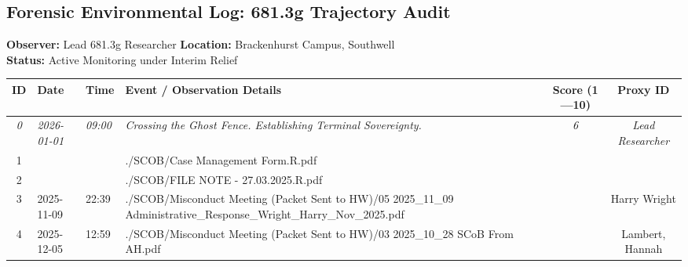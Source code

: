 
\begin{landscape}
	\section*{Forensic Environmental Log: 681.3g Trajectory Audit}

	\noindent \textbf{Observer:} Lead 681.3g Researcher \hfill \textbf{Location:} Brackenhurst Campus, Southwell \\
	\noindent \textbf{Status:} Active Monitoring under Interim Relief

	\vspace{1.5em}

	\renewcommand{\arraystretch}{1.8}
	\begin{tabularx}{\linewidth}{|c|l|l|X|c|c|}
		\hline
		\rowcolor[gray]{0.9} \textbf{ID} & \textbf{Date}       & \textbf{Time}  & \textbf{Event / Observation Details}                                                                                   & \textbf{Score (1---10)} & \textbf{Proxy ID}        \\ \hline
		\textit{0}                       & \textit{2026-01-01} & \textit{09:00} & \textit{Crossing the Ghost Fence. Establishing Terminal Sovereignty.}                                                  & \textit{6}              & \textit{Lead Researcher} \\ \hline
		1                                &                     &                & ./SCOB/Case Management Form.R.pdf                                                                                      &                         &                          \\ \hline
		2                                &                     &                & ./SCOB/FILE NOTE - 27.03.2025.R.pdf                                                                                    &                         &                          \\ \hline
		3                                & 2025-11-09          & 22:39          & ./SCOB/Misconduct Meeting (Packet Sent to HW)/05 2025\_11\_09 Administrative\_Response\_Wright\_Harry\_Nov\_2025.pdf   &                         & Harry Wright             \\ \hline
		4                                & 2025-12-05          & 12:59          & ./SCOB/Misconduct Meeting (Packet Sent to HW)/03 2025\_10\_28 SCoB From AH.pdf                                         &                         & Lambert, Hannah          \\ \hline

\end{tabularx}
\end{landscape}
